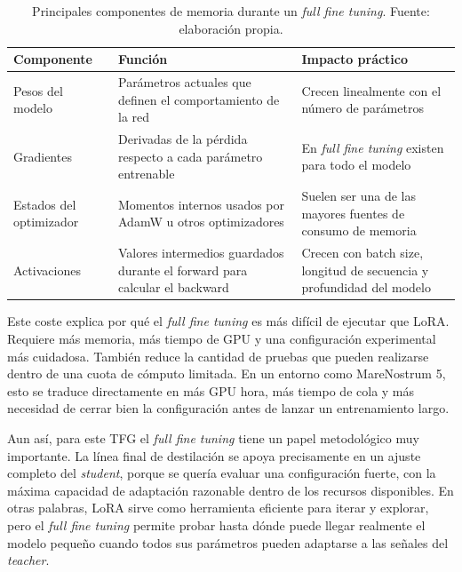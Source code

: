 \begin{table}[H]
\centering
\caption{Principales componentes de memoria durante un \textit{full fine tuning}. Fuente: elaboración propia.}
\label{tab:memoria-full-ft}
\footnotesize
\begin{tabularx}{\textwidth}{>{\raggedright\arraybackslash}p{3.0cm} >{\raggedright\arraybackslash}X >{\raggedright\arraybackslash}p{3.8cm}}
\toprule
\textbf{Componente} & \textbf{Función} & \textbf{Impacto práctico} \\
\midrule
Pesos del modelo & Parámetros actuales que definen el comportamiento de la red & Crecen linealmente con el número de parámetros \\
\addlinespace
Gradientes & Derivadas de la pérdida respecto a cada parámetro entrenable & En \textit{full fine tuning} existen para todo el modelo \\
\addlinespace
Estados del optimizador & Momentos internos usados por AdamW u otros optimizadores & Suelen ser una de las mayores fuentes de consumo de memoria \\
\addlinespace
Activaciones & Valores intermedios guardados durante el forward para calcular el backward & Crecen con batch size, longitud de secuencia y profundidad del modelo \\
\bottomrule
\end{tabularx}
\end{table}

Este coste explica por qué el \textit{full fine tuning} es más difícil de ejecutar que LoRA. Requiere más memoria, más tiempo de GPU y una configuración experimental más cuidadosa. También reduce la cantidad de pruebas que pueden realizarse dentro de una cuota de cómputo limitada. En un entorno como MareNostrum 5, esto se traduce directamente en más GPU hora, más tiempo de cola y más necesidad de cerrar bien la configuración antes de lanzar un entrenamiento largo.

Aun así, para este TFG el \textit{full fine tuning} tiene un papel metodológico muy importante. La línea final de destilación se apoya precisamente en un ajuste completo del \textit{student}, porque se quería evaluar una configuración fuerte, con la máxima capacidad de adaptación razonable dentro de los recursos disponibles. En otras palabras, LoRA sirve como herramienta eficiente para iterar y explorar, pero el \textit{full fine tuning} permite probar hasta dónde puede llegar realmente el modelo pequeño cuando todos sus parámetros pueden adaptarse a las señales del \textit{teacher}.

